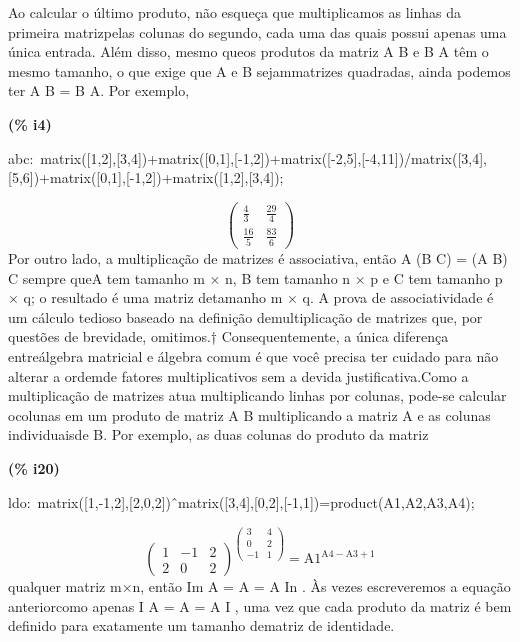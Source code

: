\documentclass[fleqn]{article}
\begin{document}
Ao calcular o último produto, não esqueça que multiplicamos as linhas da primeira matrizpelas colunas do segundo, cada uma das quais possui apenas uma única entrada. Além disso, mesmo queos produtos da matriz A B e B A têm o mesmo tamanho, o que exige que A e B sejammatrizes quadradas, ainda podemos ter A B = B A. Por exemplo,


\noindent
\begin{minipage}[t]{4.000000em}\color{red}\bfseries
(\% i4)	
\end{minipage}
\begin{minipage}[t]{\textwidth}\color{blue}
abc:\ matrix([1,2],[3,4])+matrix([0,1],[-1,2])+matrix([-2,5],[-4,11])/matrix([3,4],[5,6])+matrix([0,1],[-1,2])+matrix([1,2],[3,4]);
\end{minipage}
\[\displaystyle \tag{abc} 
\begin{pmatrix}\frac{4}{3} & \frac{29}{4}\\
\frac{16}{5} & \frac{83}{6}\end{pmatrix}\mbox{}
\]
Por outro lado, a multiplicação de matrizes é associativa, então A (B C) = (A B) C sempre queA tem tamanho m × n, B tem tamanho n × p e C tem tamanho p × q; o resultado é uma matriz detamanho m × q. A prova de associatividade é um cálculo tedioso baseado na definição demultiplicação de matrizes que, por questões de brevidade, omitimos.† Consequentemente, a única diferença entreálgebra matricial e álgebra comum é que você precisa ter cuidado para não alterar a ordemde fatores multiplicativos sem a devida justificativa.Como a multiplicação de matrizes atua multiplicando linhas por colunas, pode-se calcular ocolunas em um produto de matriz A B multiplicando a matriz A e as colunas individuaisde B. Por exemplo, as duas colunas do produto da matriz


\noindent
\begin{minipage}[t]{4.000000em}\color{red}\bfseries
(\% i20)	
\end{minipage}
\begin{minipage}[t]{\textwidth}\color{blue}
ldo:\ matrix([1,-1,2],[2,0,2])\^\ matrix([3,4],[0,2],[-1,1])=product(A1,A2,A3,A4);
\end{minipage}
\[\displaystyle \tag{ldo} 
{{\begin{pmatrix}1 & \mathop{-}1 & 2\\
2 & 0 & 2\end{pmatrix}}^{\begin{pmatrix}3 & 4\\
0 & 2\\
\mathop{-}1 & 1\end{pmatrix}}}\mathop{=}{{\ensuremath{\mathrm{A1}}}^{\ensuremath{\mathrm{A4}}\mathop{-}\ensuremath{\mathrm{A3}}\mathop{+}1}}\mbox{}
\]
qualquer matriz m×n, então Im A = A = A In . Às vezes escreveremos a equação anteriorcomo apenas I A = A = A I , uma vez que cada produto da matriz é bem definido para exatamente um tamanho dematriz de identidade.
\end{document}
